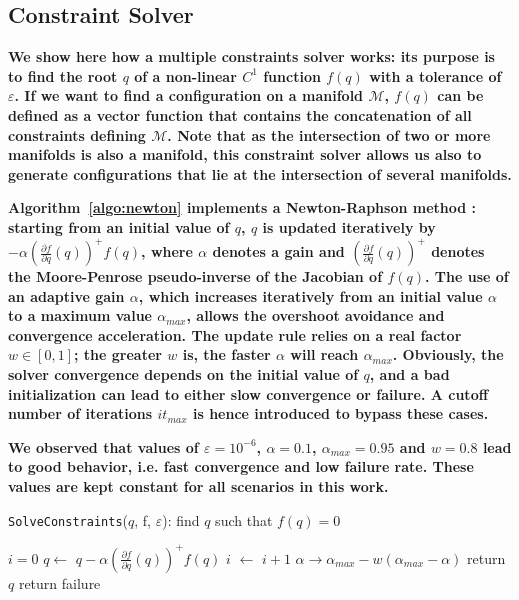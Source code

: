 \documentclass{article}
\newcommand\manifold{\mathcal{M}}
\begin{document}
\subsection{Constraint Solver}
\label{sec:SolveConstraints}

\textbf{We show here how a multiple constraints solver works: its
  purpose is to find the root $q$ of a non-linear $C^1$ function
  $f(q)$ with a tolerance of $\varepsilon$. If we want to find a
  configuration on a manifold $\manifold$, $f(q)$ can be defined as a
  vector function that contains the concatenation of all constraints
  defining $\manifold$. Note that as the intersection of two or more
  manifolds is also a manifold, this constraint solver allows us also
  to generate configurations that lie at the intersection of several
  manifolds.}

\textbf{Algorithm~\ref{algo:newton} implements a Newton-Raphson method
  \cite{bonnans2006numerical}: starting from an initial value of $q$,
  $q$ is updated iteratively by $- \alpha \left(\frac{\partial
    f}{\partial q}(q)\right)^{+} f(q)$, where $\alpha$ denotes a gain
  and $\left(\frac{\partial f}{\partial q}(q)\right)^{+}$ denotes the
  Moore-Penrose pseudo-inverse of the Jacobian of $f(q)$. The use of
  an adaptive gain $\alpha$, which increases iteratively from an
  initial value $\alpha$ to a maximum value $\alpha_{max}$, allows the
  overshoot avoidance and convergence acceleration. The update rule
  relies on a real factor $w \in [0,1]$; the greater $w$ is, the
  faster $\alpha$ will reach $\alpha_{max}$. Obviously, the solver
  convergence depends on the initial value of $q$, and a bad
  initialization can lead to either slow convergence or failure. A
  cutoff number of iterations $it_{max}$ is hence introduced to bypass
  these cases.}

\textbf{We observed that values of $\varepsilon=10^{-6}$,
  $\alpha=0.1$, $\alpha_{max}=0.95$ and $w=0.8$ lead to good behavior,
  i.e. fast convergence and low failure rate. These values are kept
  constant for all scenarios in this work.}

\begin{algorithm}
\caption{\texttt{SolveConstraints}($q$, f, $\varepsilon$): find $q$
  such that $f(q) = 0$}
\label{algo:newton}
\begin{algorithmic}
\STATE $i=0$
\STATE $q \leftarrow$ $q - \alpha \left(\frac{\partial f}{\partial q}(q)\right)^{+} f(q)$
\STATE $i$ $\leftarrow$ $i+1$
\STATE $\alpha \rightarrow \alpha_{max} - w(\alpha_{max} - \alpha)$
\ENDWHILE
{}
\STATE return $q$
\ELSE
\STATE return failure
\ENDIF
\end{algorithmic}
\end{algorithm}
\end{document}
